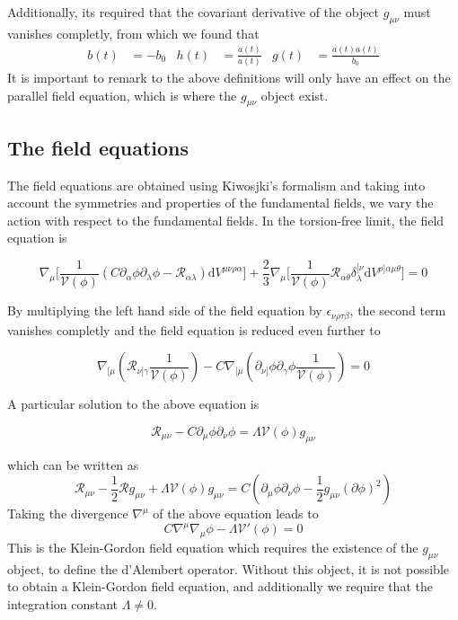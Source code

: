 \documentclass[10pt,a4paper]{article}
\begin{document}
Additionally, its required that the covariant derivative of the object $g_{\mu\nu}$ must vanishes completly, from which we found that
\begin{align}
  b(t) & = -b_0 & h(t) & = \frac{\dot{a}(t)}{a(t)} & g(t) & = \frac{\dot{a}(t)a(t)}{b_0}
\end{align}
It is important to remark to the above definitions will only have an effect on the parallel field equation, which 
is where the $g_{\mu\nu}$ object exist.


\subsection{The field equations}

The field equations are obtained using Kiwosjki's formalism and taking into account the symmetries and properties of the fundamental fields, we 
vary the action with respect to the fundamental fields. In the torsion-free limit, the field equation is

\begin{equation}
  \nabla_\mu \biggl[\frac{1}{\mathcal{V}(\phi)} \left(C \partial_\alpha \phi \partial_\lambda \phi - \mathcal{R}_{\alpha\lambda}\right)\mathrm{d}V^{\mu\nu\rho\alpha}\biggr] 
  + \frac{2}{3}\nabla_\mu \biggl[ \frac{1}{\mathcal{V}(\phi)}\mathcal{R}_{\alpha\theta} \delta^{[\nu}_{\lambda}\mathrm{d}V^{\rho]\alpha\mu\theta} \biggr] = 0
\end{equation}

By multiplying the left hand side of the field equation by $\epsilon_{\nu\rho\tau\beta}$, the second term vanishes completly and the field 
equation is reduced even further to

\begin{equation}
  \nabla_{[\mu}\left(\mathcal{R}_{\nu]\gamma}\frac{1}{\mathcal{V}(\phi)}\right) 
  - C \nabla_{[\mu}\left(\partial_{\nu]} \phi \partial_\gamma \phi \frac{1}{\mathcal{V}(\phi)}\right) = 0
\end{equation}

A particular solution to the above equation is

\begin{equation}
  \mathcal{R}_{\mu\nu} - C\partial_\mu \phi \partial_\nu \phi = \Lambda \mathcal{V}(\phi) g_{\mu\nu}
\end{equation}

which can be written as
\begin{equation}
  \mathcal{R}_{\mu\nu} - \frac{1}{2}\mathcal{R}g_{\mu\nu} + \Lambda \mathcal{V}(\phi) g_{\mu\nu} = 
  C\left(\partial_\mu \phi \partial_\nu \phi - \frac{1}{2}g_{\mu\nu} (\partial \phi)^2\right)
\end{equation}
Taking the divergence $\nabla^\mu$ of the above equation leads to
\begin{equation}
  C \nabla^\mu \nabla_\mu \phi - \Lambda \mathcal{V}'(\phi) = 0
\end{equation}
This is the Klein-Gordon field equation which requires the existence of the $g_{\mu\nu}$ object, to define the 
d'Alembert operator. Without this object, it is not possible to obtain a Klein-Gordon field equation, 
and additionally we require that the integration constant $\Lambda \neq 0$.
\end{document}
